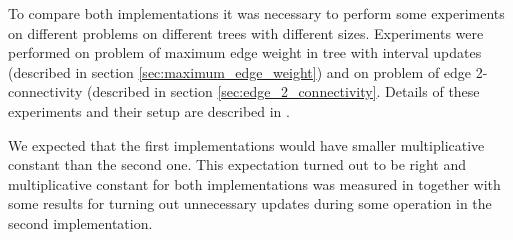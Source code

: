 To compare both implementations it was necessary to perform some experiments on
different problems on different trees with different sizes. Experiments were
performed on problem of {\I maximum edge weight in tree with interval updates}
(described in section \ref{sec:maximum_edge_weight}) and on problem of {\I edge
2-connectivity} (described in section \ref{sec:edge_2_connectivity}. Details of
these experiments and their setup are described in .

We expected that the first implementations would have smaller multiplicative
constant than the second one. This expectation turned out to be right and
multiplicative constant for both implementations was measured in
 together with some results for turning out unnecessary
updates during some operation in the second implementation.
